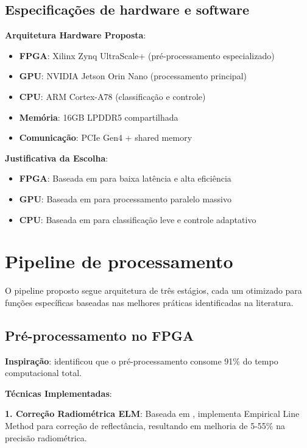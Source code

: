\subsection{Especificações de hardware e software}\label{subsec:especificacoes_hw_sw}

\textbf{Arquitetura Hardware Proposta}:
\begin{itemize}
    \item \textbf{FPGA}: Xilinx Zynq UltraScale+ (pré-processamento especializado)
    \item \textbf{GPU}: NVIDIA Jetson Orin Nano (processamento principal)
    \item \textbf{CPU}: ARM Cortex-A78 (classificação e controle)
    \item \textbf{Memória}: 16GB LPDDR5 compartilhada
    \item \textbf{Comunicação}: PCIe Gen4 + shared memory
\end{itemize}

\textbf{Justificativa da Escolha}:
\begin{itemize}
    \item \textbf{FPGA}: Baseada em \textcite{Hwang2011} para baixa latência e alta eficiência
    \item \textbf{GPU}: Baseada em \textcite{Diaz2019} para processamento paralelo massivo
    \item \textbf{CPU}: Baseada em \textcite{TakuNet2024} para classificação leve e controle adaptativo
\end{itemize}

\section{Pipeline de processamento}\label{sec:pipeline_processamento}

O pipeline proposto segue arquitetura de três estágios, cada um otimizado para funções específicas baseadas nas melhores práticas identificadas na literatura.

\subsection{Pré-processamento no FPGA}\label{subsec:preprocessamento_fpga}

\textbf{Inspiração}: \textcite{Hwang2011} identificou que o pré-processamento consome 91\% do tempo computacional total.

\textbf{Técnicas Implementadas}:

\textbf{1. Correção Radiométrica ELM}: Baseada em \textcite{Shin2024}, implementa Empirical Line Method para correção de reflectância, resultando em melhoria de 5-55\% na precisão radiométrica.

